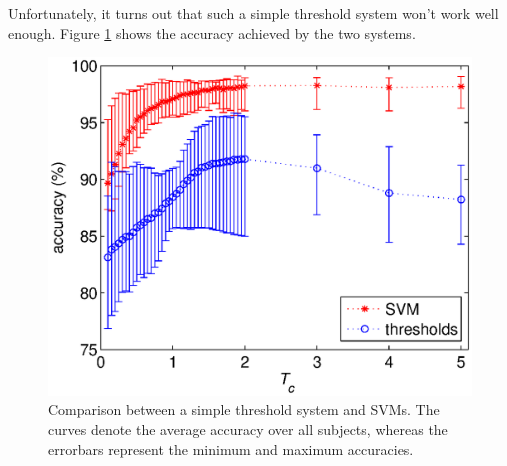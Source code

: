 \documentclass[a4paper,10pt,conference]{ieeeconf}
\begin{document}
Unfortunately, it turns out that such a simple threshold system won't
work well enough. Figure \ref{fig:comparison} shows the accuracy
achieved by the two systems.

\begin{figure}[htbp]
  \centering
    \includegraphics[width=\linewidth]{comparison.eps}
    \caption{Comparison between a simple threshold system and
    SVMs. The curves denote the average accuracy over all subjects,
    whereas the errorbars represent the minimum and maximum
    accuracies.}
    \label{fig:comparison}
\end{figure}
\end{document}
